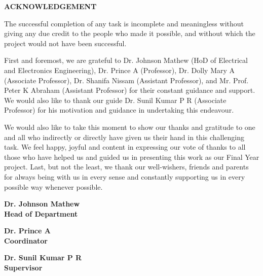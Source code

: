 \begin{center}
\Large \textbf{ACKNOWLEDGEMENT}\\
\end{center}
\vspace{0.5cm}
     
The successful completion of any task is incomplete and meaningless without giving any due credit to the people who made it possible, and without which the project would not have been successful.
     
First and foremost, we are grateful to Dr. Johnson Mathew (HoD of Electrical and Electronics Engineering), Dr. Prince A (Professor), Dr. Dolly Mary A (Associate Professor), Dr. Shanifa Nissam (Assistant Professor), and Mr. Prof. Peter K Abraham (Assistant Professor) for their constant guidance and support. We would also like to thank our guide Dr. Sunil Kumar P R (Associate Professor) for his motivation and guidance in undertaking this endeavour.
     
We would also like to take this moment to show our thanks and gratitude to one and all who indirectly or directly have given us their hand in this challenging task. We feel happy, joyful and content in expressing our vote of thanks to all those who have helped us and guided us in presenting this work as our Final Year project. Last, but not the least, we thank our well-wishers, friends and parents for always being with us in every sense and constantly supporting us in every possible way whenever possible.

\vspace{2 cm}     

\begin{multicols}{3}
\centering
\textbf{Dr. Johnson Mathew}\\
\textbf{Head of Department}\\
\vspace{0.3cm}

\textbf{Dr. Prince A}\\
\textbf{Coordinator}\\
\vspace{0.3cm}

\textbf{Dr. Sunil Kumar P R}\\
\textbf{Supervisor}\\
\vspace{0.3cm}
\end{multicols}
